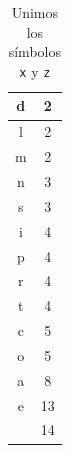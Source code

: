 \documentclass[letterpaper,11pt]{article}
\begin{document}
\begin{enumerate}
\begin{table}[h]
{\begin{tabular}{|c|c|}
            d & 2 \\
            \hline
            l & 2 \\
            \hline
            m & 2 \\
            \hline
            n & 3 \\
            \hline
            s & 3 \\
            \hline
            i & 4 \\
            \hline
            p & 4 \\
            \hline
            r & 4 \\
            \hline
            t & 4 \\
            \hline
            c & 5 \\
            \hline
            o & 5 \\
            \hline
            a & 8 \\
            \hline
            e & 13 \\
            \hline
            \texttt{\char32} & 14 \\
            \hline
        \end{tabular}
        \caption{Unimos los símbolos \texttt{x} y \texttt{z}}
        }
    \end{table}


\end{enumerate}
\end{document}
